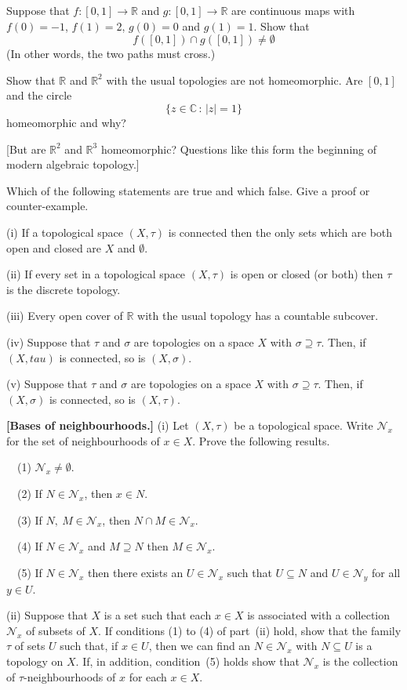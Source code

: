 \begin{exercise}\label{E;dimension}
Suppose that $f:[0,1]\rightarrow{\mathbb R}$
and $g:[0,1]\rightarrow{\mathbb R}$
are continuous maps with $f(0)=-1$, $f(1)=2$,
$g(0)=0$ and $g(1)=1$. Show that
\[f([0,1])\cap g([0,1])\neq\emptyset\]
(In other words, the two paths must cross.)

Show that ${\mathbb R}$ and ${\mathbb R}^{2}$
with the usual topologies are not homeomorphic.
Are $[0,1]$ and the circle
\[\{z\in{\mathbb C}\,:\,|z|=1\}\]
homeomorphic and why?

[But are ${\mathbb R}^{2}$ and ${\mathbb R}^{3}$
homeomorphic? Questions like this form the beginning of modern
algebraic topology.]
\end{exercise}
\begin{exercise} Which of the following statements
are true and which false. Give a proof or counter-example.

(i) If a topological space $(X,\tau)$ is connected 
then the only sets which
are both open and closed are $X$ and $\emptyset$.

(ii) If every set in a topological space $(X,\tau)$
is open or closed (or both) then $\tau$ is the discrete
topology.

(iii) Every open cover of ${\mathbb R}$ with the usual topology
has a countable subcover.

(iv) Suppose that $\tau$ and $\sigma$ are topologies
on a space $X$ with $\sigma\supseteq\tau$. Then,
if $(X,tau)$ is connected, so is $(X,\sigma)$.

(v) Suppose that $\tau$ and $\sigma$ are topologies
on a space $X$ with $\sigma\supseteq\tau$. Then,
if $(X,\sigma)$ is connected, so is $(X,\tau)$.
\end{exercise}  
\begin{exercise}{\bf [Bases of neighbourhoods.]}%
\label{E;bases of neighbourhoods}%
(i) Let $(X,\tau)$ be a
topological space.
Write ${\mathcal N}_{x}$ for the set of neighbourhoods
of $x\in X$. Prove the following results.

\ \ (1) ${\mathcal N}_{x}\neq\emptyset$.

\ \ (2) If $N\in {\mathcal N}_{x}$, then $x\in N$.

\ \ (3) If $N,\ M\in {\mathcal N}_{x}$,
then $N\cap M\in{\mathcal N}_{x}$.

\ \ (4) If $N\in{\mathcal N}_{x}$ and $M\supseteq N$
then $M\in{\mathcal N}_{x}$.

\ \ (5) If $N\in{\mathcal N}_{x}$ then there exists
an $U\in{\mathcal N}_{x}$ such that
$U\subseteq N$ and $U\in{\mathcal N}_{y}$ for all
$y\in U$.

(ii) Suppose that $X$ is a set such that each $x\in X$
is associated with a collection ${\mathcal N}_{x}$
of subsets of $X$. If conditions (1) to (4) of
part~(ii) hold, show that the family $\tau$ of sets
$U$ such that, if $x\in U$, then we can
find an $N\in{\mathcal N}_{x}$ with $N\subseteq U$
is a topology on $X$. If, in addition, condition~(5)
holds show that ${\mathcal N}_{x}$ is the collection
of $\tau$-neighbourhoods of $x$ for each $x\in X$.
\end{exercise}
